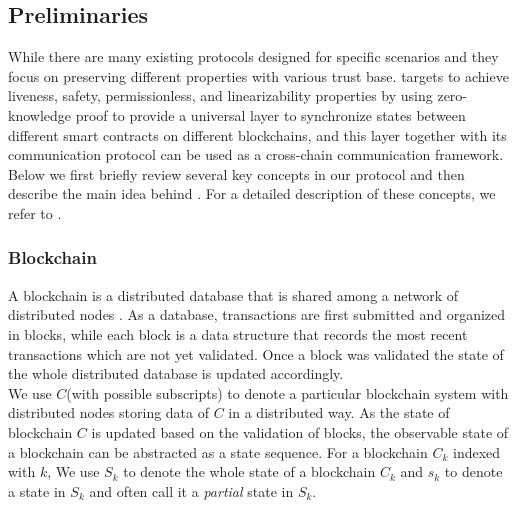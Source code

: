 \documentclass[pageno]{jpaper}
\begin{document}
\subsection{Preliminaries}
\label{prelimiary}
While there are many existing protocols designed for specific scenarios and they focus on preserving different properties with various trust base. \dprotocol targets to achieve liveness, safety, permissionless, and linearizability properties by using zero-knowledge proof to provide a universal layer to synchronize states between different smart contracts on different blockchains, and this layer together with its communication protocol can be used as a cross-chain communication framework. Below we first briefly review several key concepts in our protocol and then describe the main idea behind \dprotocol. For a detailed description of these concepts, we refer to \cite{robinson2021survey}. 
\\
\subsubsection{Blockchain}
A blockchain is a distributed database that is shared among a network of distributed nodes \cite{chen2018survey}. As a database, transactions are first submitted and organized in blocks, while each block is a data structure that records the most recent transactions which are not yet validated. Once a block was validated the state of the whole distributed database is updated accordingly.\\
\newline
We use $C$(with possible subscripts) to denote a particular blockchain system with distributed nodes storing data of $C$ in a distributed way. As the state of blockchain $C$ is updated based on the validation of blocks, the observable state of a blockchain can be abstracted as a state sequence. For a blockchain $C_k$ indexed with $k$, We use $S_k$ to denote the whole state of a blockchain $C_{k}$ and $s_k$ to denote a state in $S_k$ and often call it a \emph{partial} state in $S_k$.
\\
\end{document}
